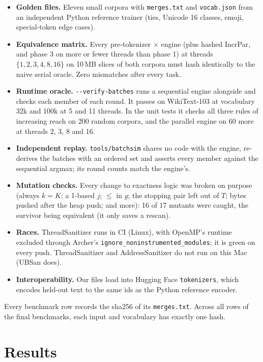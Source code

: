 \documentclass[11pt,a4paper]{article}
\newcommand{\code}[1]{\texttt{#1}}
\begin{document}
\begin{itemize}
\item \textbf{Golden files.} Eleven small corpora with \code{merges.txt} and \code{vocab.json} from an independent Python
  reference trainer (ties, Unicode 16 classes, emoji, special-token edge cases).
\item \textbf{Equivalence matrix.} Every pre-tokenizer $\times$ engine (plus hashed IncrPar, and phase 3 on more or
  fewer threads than phase 1) at threads
  $\{1,2,3,4,8,16\}$ on 10\,MB slices of both corpora must hash identically to the naive serial oracle. Zero mismatches
  after every task.
\item \textbf{Runtime oracle.} \code{-{}-verify-batches} runs a sequential engine alongside and checks each member of each
  round. It passes on WikiText-103 at vocabulary 32k and 100k at 5 and 11 threads. In the unit tests it checks all three
  rules of increasing reach on 200 random corpora, and the parallel engine on 60 more at threads 2, 3, 8 and 16.
\item \textbf{Independent replay.} \code{tools/batchsim} shares no code with the engine, re-derives the batches with an
  ordered set and asserts every member against the sequential argmax; its round counts match the engine's.
\item \textbf{Mutation checks.} Every change to exactness logic was broken on purpose (always $k=K$; a 1-based $j$; $\le$ in
  $g$; the stopping pair left out of $T$; bytes pushed after the heap push; and more): 16 of 17 mutants were caught, the
  survivor being equivalent (it only saves a rescan).
\item \textbf{Races.} ThreadSanitizer runs in CI (Linux), with OpenMP's runtime excluded through Archer's
  \code{ignore\_noninstrumented\_modules}; it is green on every push. ThreadSanitizer and AddressSanitizer do not run
  on this Mac (UBSan does).
\item \textbf{Interoperability.} Our files load into Hugging Face \code{tokenizers}, which encodes held-out text to the
  same ids as the Python reference encoder.
\end{itemize}

Every benchmark row records the sha256 of its \code{merges.txt}. Across all \hashRows{} rows of the final benchmarks, each
input and vocabulary has exactly one hash.

\section{Results}
\label{sec:results}
\end{document}
